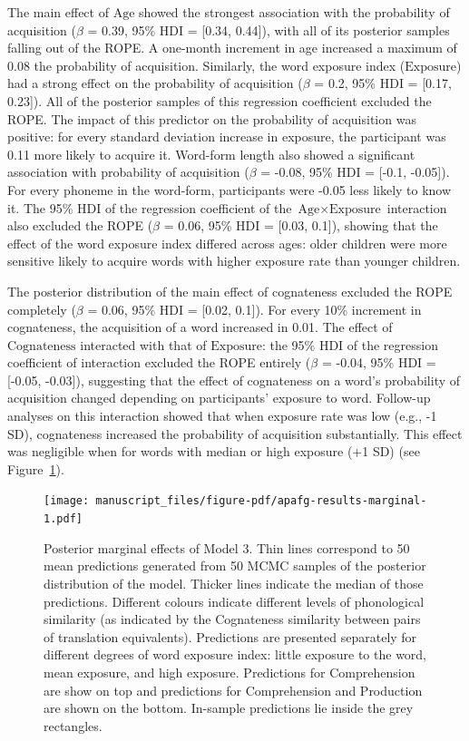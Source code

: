 \documentclass[
  man,
  floatsintext,
  colorlinks=true,linkcolor=blue,citecolor=blue,urlcolor=blue,biblatex]{apa7}
\begin{document}
The main effect of \(\text{Age}\) showed the strongest association with
the probability of acquisition (\(\beta\) = 0.39, 95\% HDI = {[}0.34,
0.44{]}), with all of its posterior samples falling out of the ROPE. A
one-month increment in age increased a maximum of 0.08 the probability
of acquisition. Similarly, the word exposure index (\(\text{Exposure}\))
had a strong effect on the probability of acquisition (\(\beta\) = 0.2,
95\% HDI = {[}0.17, 0.23{]}). All of the posterior samples of this
regression coefficient excluded the ROPE. The impact of this predictor
on the probability of acquisition was positive: for every standard
deviation increase in exposure, the participant was 0.11 more likely to
acquire it. Word-form length also showed a significant association with
probability of acquisition (\(\beta\) = -0.08, 95\% HDI = {[}-0.1,
-0.05{]}). For every phoneme in the word-form, participants were -0.05
less likely to know it. The 95\% HDI of the regression coefficient of
the \(\text{Age} \times \text{Exposure}\) interaction also excluded the
ROPE (\(\beta\) = 0.06, 95\% HDI = {[}0.03, 0.1{]}), showing that the
effect of the word exposure index differed across ages: older children
were more sensitive likely to acquire words with higher exposure rate
than younger children.

The posterior distribution of the main effect of cognateness excluded
the ROPE completely (\(\beta\) = 0.06, 95\% HDI = {[}0.02, 0.1{]}). For
every 10\% increment in cognateness, the acquisition of a word increased
in 0.01. The effect of \(\text{Cognateness}\) interacted with that of
\(\text{Exposure}\): the 95\% HDI of the regression coefficient of
interaction excluded the ROPE entirely (\(\beta\) = -0.04, 95\% HDI =
{[}-0.05, -0.03{]}), suggesting that the effect of cognateness on a
word's probability of acquisition changed depending on participants'
exposure to word. Follow-up analyses on this interaction showed that
when exposure rate was low (e.g., -1 SD), cognateness increased the
probability of acquisition substantially. This effect was negligible
when for words with median or high exposure (+1 SD) (see
Figure~\ref{apafg-results-marginal}).

\begin{figure}[h!]
\caption{Posterior marginal effects of Model 3. Thin lines correspond to 50 mean predictions generated from 50 MCMC samples of the posterior distribution of the model. Thicker lines indicate the median of those predictions. Different colours indicate different levels of phonological similarity (as indicated by the Cognateness similarity between pairs of translation equivalents). Predictions are presented separately for different degrees of word exposure index: little exposure to the word, mean exposure, and high exposure. Predictions for Comprehension are show on top and predictions for Comprehension and Production are shown on the bottom. In-sample predictions lie inside the grey rectangles.}
\label{apafg-results-marginal}
\texttt{[image: manuscript\_files/figure-pdf/apafg-results-marginal-1.pdf]}

\end{figure}
\end{document}
